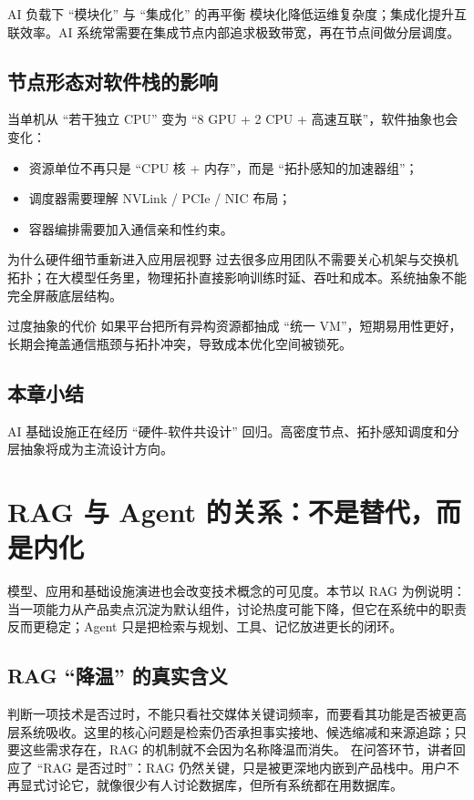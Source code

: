 \documentclass[a4paper]{article}
\begin{document}
\begin{importantbox}{AI 负载下 ``模块化'' 与 ``集成化'' 的再平衡}
模块化降低运维复杂度；集成化提升互联效率。AI 系统常需要在集成节点内部追求极致带宽，再在节点间做分层调度。
\end{importantbox}

\subsection{节点形态对软件栈的影响}
当单机从 ``若干独立 CPU'' 变为 ``8 GPU + 2 CPU + 高速互联''，软件抽象也会变化：
\begin{itemize}
    \item 资源单位不再只是 ``CPU 核 + 内存''，而是 ``拓扑感知的加速器组''；
    \item 调度器需要理解 NVLink / PCIe / NIC 布局；
    \item 容器编排需要加入通信亲和性约束。
\end{itemize}

\begin{knowledgebox}{为什么硬件细节重新进入应用层视野}
过去很多应用团队不需要关心机架与交换机拓扑；在大模型任务里，物理拓扑直接影响训练时延、吞吐和成本。系统抽象不能完全屏蔽底层结构。
\end{knowledgebox}

\begin{warningbox}{过度抽象的代价}
如果平台把所有异构资源都抽成 ``统一 VM''，短期易用性更好，长期会掩盖通信瓶颈与拓扑冲突，导致成本优化空间被锁死。
\end{warningbox}

\subsection{本章小结}
AI 基础设施正在经历 ``硬件-软件共设计'' 回归。高密度节点、拓扑感知调度和分层抽象将成为主流设计方向。

\section{RAG 与 Agent 的关系：不是替代，而是内化}

模型、应用和基础设施演进也会改变技术概念的可见度。本节以 RAG 为例说明：当一项能力从产品卖点沉淀为默认组件，讨论热度可能下降，但它在系统中的职责反而更稳定；Agent 只是把检索与规划、工具、记忆放进更长的闭环。

\subsection{RAG ``降温'' 的真实含义}
判断一项技术是否过时，不能只看社交媒体关键词频率，而要看其功能是否被更高层系统吸收。这里的核心问题是检索仍否承担事实接地、候选缩减和来源追踪；只要这些需求存在，RAG 的机制就不会因为名称降温而消失。
在问答环节，讲者回应了 ``RAG 是否过时''：RAG 仍然关键，只是被更深地内嵌到产品栈中。用户不再显式讨论它，就像很少有人讨论数据库，但所有系统都在用数据库。
\end{document}
